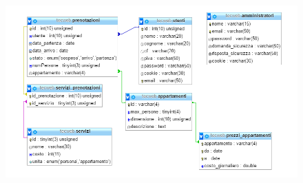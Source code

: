 \documentclass[12pt]{article}
\begin{document}
\begin{figure}[H]
\centering
\includegraphics[scale=0.80]{images/Struttura_Database.png}
\end{figure} 
\end{document}
